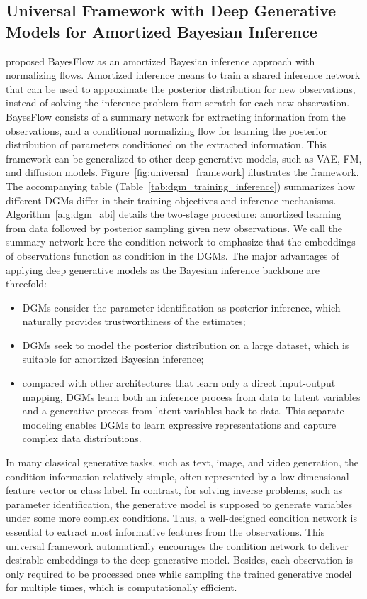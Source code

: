 \subsection{Universal Framework with Deep Generative Models for Amortized Bayesian Inference}
\citeauthor{radev2020bayesflow} \citeyearpar{radev2020bayesflow} proposed BayesFlow as an amortized Bayesian inference approach with normalizing flows. Amortized inference means to train a shared inference network that can be used to approximate the posterior distribution for new observations, instead of solving the inference problem from scratch for each new observation. BayesFlow consists of a summary network for extracting information from the observations, and a conditional normalizing flow for learning the posterior distribution of parameters conditioned on the extracted information. This framework can be generalized to other deep generative models, such as \ac{VAE}, \ac{FM}, and diffusion models. Figure~\ref{fig:universal_framework} illustrates the framework. The accompanying table (Table~\ref{tab:dgm_training_inference}) summarizes how different \acp{DGM} differ in their training objectives and inference mechanisms. Algorithm~\ref{alg:dgm_abi} details the two-stage procedure: amortized learning from data followed by posterior sampling given new observations. We call the summary network here the condition network to emphasize that the embeddings of observations function as condition in the \acp{DGM}. The major advantages of applying deep generative models as the Bayesian inference backbone are threefold:
\begin{itemize}
    \item \acp{DGM} consider the parameter identification as posterior inference, which naturally provides trustworthiness of the estimates;
    \item \acp{DGM} seek to model the posterior distribution on a large dataset, which is suitable for amortized Bayesian inference;
    \item compared with other architectures that learn only a direct input-output mapping, \acp{DGM} learn both an inference process from data to latent variables and a generative process from latent variables back to data. This separate modeling enables \acp{DGM} to learn expressive representations and capture complex data distributions.
\end{itemize}

In many classical generative tasks, such as text, image, and video generation, the condition information relatively simple, often represented by a low-dimensional feature vector or class label. In contrast, for solving inverse problems, such as parameter identification, the generative model is supposed to generate variables under some more complex conditions. Thus, a well-designed condition network is essential to extract most informative features from the observations. This universal framework automatically encourages the condition network to deliver desirable embeddings to the deep generative model. Besides, each observation is only required to be processed once while sampling the trained generative model for multiple times, which is computationally efficient. 

